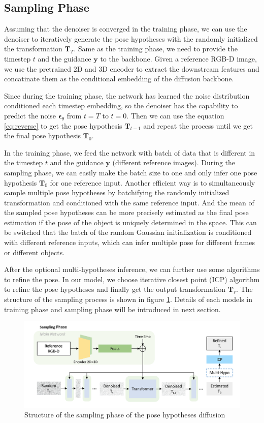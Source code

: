 \documentclass[12pt,DIV14,BCOR12mm,a4paper,footinclude=false,headinclude,parskip=half-,twoside,openright,cleardoublepage=empty,toc=index,bibliography=totoc,listof=totoc]{scrreprt}
\numberwithin{equation}{chapter}
\begin{document}
\subsection{Sampling Phase}
Assuming that the denoiser is converged in the training phase, we can use the denoiser to iteratively generate the pose hypotheses with the randomly initialized the transformation $\mathbf{T}_{T}$. Same as the training phase, we need to provide the timestep $t$ and the guidance $\mathbf{y}$ to the backbone. Given a reference RGB-D image, we use the pretrained 2D and 3D encoder to extract the downstream features and concatinate them as the conditional embedding of the diffusion backbone. 

Since during the training phase, the network has learned the noise distribution conditioned each timestep embedding, so the denoiser has the capability to predict the noise $\boldsymbol{\epsilon}_{\theta}$ from $t=T$ to $t=0$. Then we can use the equation \ref{eq:reverse} to get the pose hypothesis $\mathbf{T}_{t-1}$ and repeat the process until we get the final pose hypothesis $\mathbf{T}_{0}$. 

In the training phase, we feed the network with batch of data that is different in the timestep $t$ and the guidance $\mathbf{y}$ (different reference images). During the sampling phase, we can easily make the batch size to one and only infer one pose hypothesis $\mathbf{T}_{0}$ for one reference input. Another efficient way is to simultaneously sample multiple pose hypotheses by batchifying the randomly initialized transformation and conditioned with the same reference input. And the mean of the sampled pose hypotheses can be more precisely estimated as the final pose estimation if the pose of the object is uniquely determined in the space. This can be switched that the batch of the random Gaussian initialization is conditioned with different reference inputs, which can infer multiple pose for different frames or different objects.

After the optional multi-hypotheses inference, we can further use some algorithms to refine the pose. In our model, we choose iterative closest point (ICP)\cite{121791} algorithm to refine the pose hypotheses and finally get the output transformation $\mathbf{T}_{r}$. The structure of the sampling process is shown in figure \ref{img:sample}. Details of each models in training phase and sampling phase will be introduced in next section.
\begin{figure}[h]
	\centering
	\includegraphics[scale=.23]{img/sample.png}
	\caption{Structure of the sampling phase of the pose hypotheses diffusion}
	\label{img:sample}
\end{figure}
\end{document}
